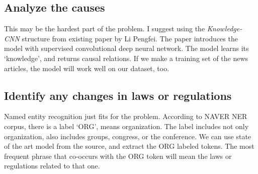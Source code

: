 \documentclass{article}
\begin{document}
\subsection{Analyze the causes}

This may be the hardest part of the problem.
I suggest using the \textit{Knowledge-CNN} structure from
existing paper\cite{li2019knowledge} by Li Pengfei.
The paper introduces the model with supervised convolutional deep neural network.
The model learns its `knowledge', and returns causal relations.
If we make a training set of the news articles,
the model will work well on our dataset, too.


\subsection{Identify any changes in laws or regulations}

Named entity recognition just fits for the problem.
According to NAVER NER corpus\cite{nercorpus},
there is a label `ORG', means organization.
The label includes not only organization,
also includes groups, congress, or the conference.
We can use state of the art model from the source,
and extract the ORG labeled tokens.
The most frequent phrase that co-occurs with the ORG token
will mean the laws or regulations related to that one. 



\end{document}
